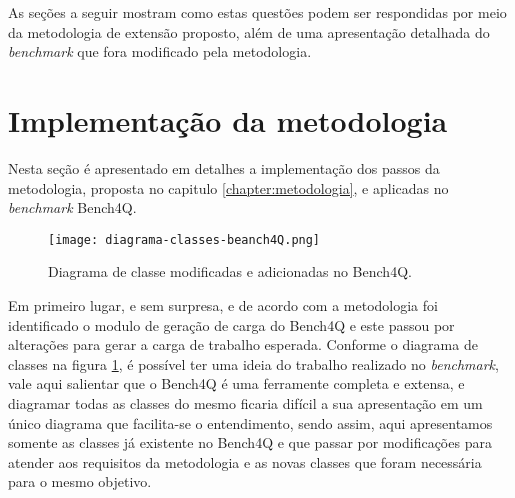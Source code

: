 As seções a seguir mostram como estas questões podem ser respondidas por meio da metodologia de extensão proposto, além de uma apresentação detalhada do \textit{benchmark} que fora modificado pela metodologia.




\section{Implementação da metodologia}

Nesta seção é apresentado em detalhes a implementação dos passos da metodologia, proposta no capitulo \ref{chapter:metodologia}, e aplicadas no \textit{benchmark} Bench4Q.

\begin{figure}[htb]
	\caption{Diagrama de classe modificadas e adicionadas no Bench4Q.}
	\label{fig:diagrama-classes}
	\centering
	\texttt{[image: diagrama-classes-beanch4Q.png]}	
\end{figure}
	
Em primeiro lugar, e sem surpresa, e de acordo com a metodologia foi identificado o modulo de geração de carga do Bench4Q e este passou por alterações para gerar a carga de trabalho esperada. Conforme o diagrama de classes na figura \ref{fig:diagrama-classes}, é possível ter uma ideia do trabalho realizado no \textit{benchmark}, vale aqui salientar que o Bench4Q é uma ferramente completa e extensa, e diagramar todas as classes do mesmo ficaria difícil a sua apresentação em um único diagrama que facilita-se o entendimento, sendo assim, aqui apresentamos somente as classes já existente no Bench4Q e que passar por modificações para atender aos requisitos da metodologia e as novas classes que foram necessária para o mesmo objetivo.
 
